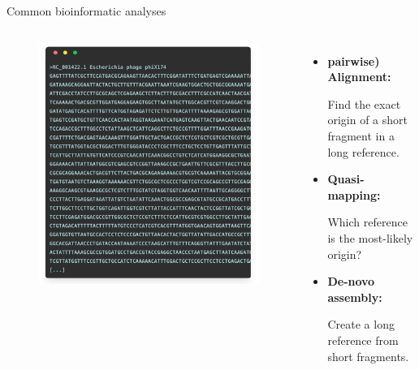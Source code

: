 \documentclass[10pt]{beamer}
\newcommand{\feature}[1]{{\color{scLime} \textbf{#1}}}
\begin{document}
\begin{frame}{Common bioinformatic analyses}
	\begin{columns}[T]
		\begin{figure}
			\includegraphics[width=\textwidth]{figures/phixgen.png}
		\end{figure}
		\vspace{2cm}
		\begin{itemize}
			\item \feature{pairwise) Alignment:} \par Find the exact origin of a short fragment in
			a long reference.
			\item \feature{Quasi-mapping:}\par Which reference is the most-likely origin?
			\item \feature{De-novo assembly:} \par Create a long reference from short
			fragments.
		\end{itemize}
	\end{columns}
\end{frame}
\end{document}
